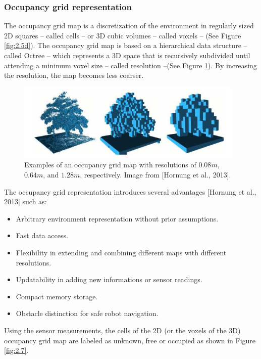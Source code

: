 \documentclass[11pt,openany]{book}
\begin{document}
\subsubsection{Occupancy grid representation}
The occupancy grid map is a discretization of the environment in regularly sized 2D squares – called cells – or 3D cubic volumes – called voxels – (See Figure \ref{fig:2.5d}). The occupancy grid map is based on a hierarchical data structure – called Octree – which represents a 3D space that is recursively subdivided until attending a minimum voxel size – called resolution –(See Figure \ref{fig:2.6}). By increasing the resolution, the map becomes less coarser.
\begin{figure}[H]
    \centering
    \includegraphics[width=\linewidth]{assets/2_6.png}
    \caption{Examples of an occupancy grid map with resolutions of $0.08m$, $0.64m$, and $1.28m$, respectively. Image from [Hornung et al., 2013].}
    \label{fig:2.6}
\end{figure}
The occupancy grid representation introduces several advantages [Hornung et al., 2013] such as:
\begin{itemize}
    \item Arbitrary environment representation without prior assumptions.
    \item Fast data access.
    \item Flexibility in extending and combining diﬀerent maps with diﬀerent resolutions.
    \item Updatability in adding new informations or sensor readings.
    \item Compact memory storage.
    \item Obstacle distinction for safe robot navigation.
\end{itemize}
Using the sensor measurements, the cells of the 2D (or the voxels of the 3D) occupancy grid map are labeled as unknown, free or occupied as shown in Figure \ref{fig:2.7}.
\end{document}

